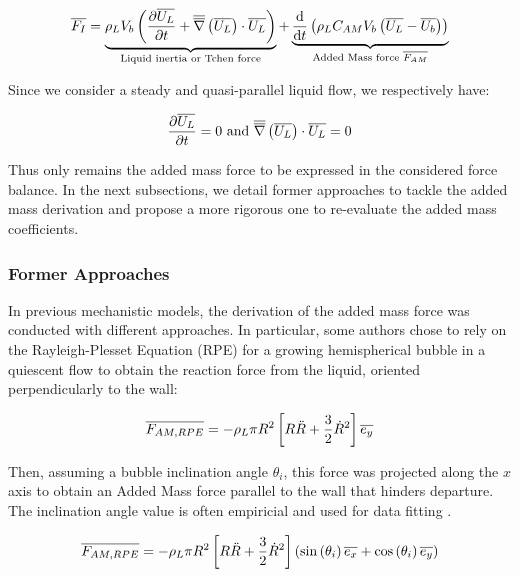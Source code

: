 \begin{equation}
\overline{F_{I}} = \underbrace{ \rho_{L}V_{b}\left( \frac{\partial{\overline{U_{L}}}}{\partial t}+\overline{\overline{\nabla}}\left({\overline{U_{L}} }\right)\cdot \overline{U_{L}} \right) }_{\text{Liquid inertia or Tchen force}} + \underbrace{ \frac{\mathrm{d}}{\mathrm{d}t}\left( \rho_{L}C_{AM}V_{b}\left( \overline{U_{L}}-\overline{U_{b}} \right) \right) }_{\text{Added Mass force } \overline{F_{AM}}}
\label{eq:F_inertia}
\end{equation}

Since we consider a steady and quasi-parallel liquid flow, we respectively have:

\begin{equation}
\dpartial{\vect{U_{L}} }{t}=0\ \text{and}\ \vecgrad{\vect{U_{L}} } \cdot \vect{U_{L}}=0
\end{equation}

Thus only remains the added mass force to be expressed in the considered force balance. In the next subsections, we detail former approaches to tackle the added mass derivation and propose a more rigorous one to re-evaluate the added mass coefficients.


\subsubsection{Former Approaches}
\label{subsubsec:former_AM}

In previous mechanistic models, the derivation of the added mass force was conducted with different approaches. In particular, some authors chose to rely on the Rayleigh-Plesset Equation (RPE) for a growing hemispherical bubble in a quiescent flow to obtain the reaction force from the liquid, oriented perpendicularly to the wall:

\begin{equation}
\overline{F_{AM,RPE}}=- \rho_{L}\pi R^{2}\left[ R\ddot{R}+\frac{3}{2}\dot{R}^{2} \right]\overline{e_{y}}
\end{equation}

Then, assuming a bubble inclination angle $\theta_{i}$, this force was projected along the $x$ axis to obtain an Added Mass force parallel to the wall that hinders departure. The inclination angle value is often empiricial and used for data fitting \cite{zeng_unified_1993-1, colombo_prediction_2015, mazzocco_reassessed_2018, ren_development_2020}.

\begin{equation}
\overline{F_{AM,RPE}}=- \rho_{L}\pi R^{2}\left[ R\ddot{R}+\frac{3}{2}\dot{R}^{2} \right]\left( \mathrm{sin}\left( \theta_{i} \right)\overline{e_{x}} + \mathrm{cos}\left( \theta_{i} \right)\overline{e_{y}} \right)
\label{eq:AM_RPE}
\end{equation}



